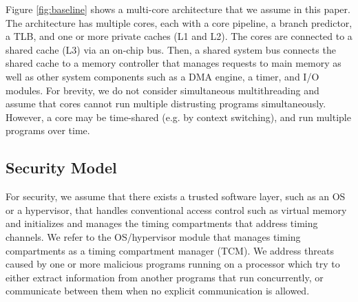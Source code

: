 Figure \ref{fig:baseline} shows a multi-core architecture that we assume
in this paper.
The architecture
has multiple cores, each with a core pipeline, a branch predictor, a TLB,
and one or more private caches (L1 and L2). 
The cores are connected to a shared cache (L3) via an on-chip bus. Then, a shared system 
bus connects the shared cache to a memory controller that manages requests to 
main memory as well as other system components such as a DMA engine, a timer, and I/O
modules.
For brevity, we do not consider simultaneous multithreading and assume that
cores cannot run multiple distrusting programs simultaneously.
However, a core may be time-shared (e.g. by context switching), and run multiple
programs over time.




\subsection{Security Model}

For security,
we assume that there exists a trusted software layer, such as an OS or a 
hypervisor, 
that handles conventional access control such as virtual memory and initializes 
and manages the timing compartments that address timing channels.
We refer to the OS/hypervisor module that manages timing compartments as
a timing compartment manager (TCM).
We address threats caused by one or more malicious programs running on a processor
which try to either extract information from another programs that run
concurrently, or communicate between them when no explicit communication is allowed. 

